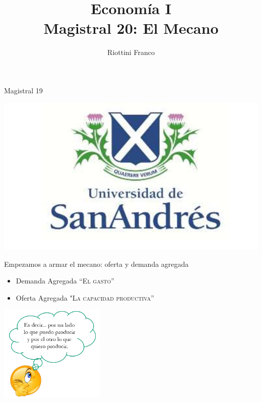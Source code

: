 \documentclass{beamer}
\title[Economía I]{Economía I \vspace{4mm}
\\ Magistral 20: El Mecano}
\date{}
\author[Riottini]{Riottini Franco}
\institute[]{Universidad de San Andrés}
\begin{document}
\begin{frame}
\titlepage
\centering
Magistral 19

\includegraphics[scale=0.2]{Slides Principios de Economia/Figures/logoUDESA.jpg} 
\end{frame}


\begin{frame}{Empezamos a armar el mecano: oferta y demanda agregada}

    \begin{itemize}
        \item Demanda Agregada \textsc{“El gasto”} \faCartPlus
        \item Oferta Agregada \textsc{"La capacidad productiva”} \faIndustry
    \end{itemize}
    \vspace{3mm}
    
    \centering\includegraphics[width=5cm]{Slides Principios de Economia/Figures/P17b.png}\

\end{frame}
\end{document}

